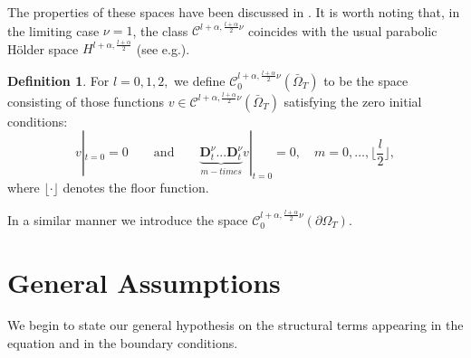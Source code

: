 \documentclass[reqno]{amsart}
\def\C {\mathcal{C}}
\theoremstyle{definition}
\newtheorem{definition}[proposition]{Definition}
\numberwithin{equation}{section}
\begin{document}
The properties of these spaces have been discussed in \cite[Section 2]{KPV3}. It is worth noting that, in the limiting case $\nu=1$, the class  $\C^{l+\alpha,\frac{l+\alpha}{2}\nu}$ coincides with the usual parabolic H\"{o}lder space $H^{l+\alpha,\frac{l+\alpha}{2}}$ (see e.g.\cite[(1.10)-(1.12)]{LSU}).
\begin{definition}\label{d2.2}
For $l=0,1,2,$ we define
$\C^{l+\alpha,\frac{l+\alpha}{2}\nu}_{0}(\bar{\Omega}_{T})$ to be
the space consisting of those functions $v\in
\C^{l+\alpha,\frac{l+\alpha}{2}\nu}(\bar{\Omega}_{T})$ satisfying
the zero initial conditions:
\begin{equation*}
 v|_{t=0}=0\qquad\text{and}\qquad
 \underbrace{\mathbf{D}_{t}^{\nu}...\mathbf{D}_{t}^{\nu}}_{m-times} v|_{t=0}=0,\quad
m=0,\ldots,\Big\lfloor\frac{l}{2}\Big\rfloor,
\end{equation*}
where $\lfloor \cdot\rfloor$ denotes the floor function.
\end{definition}
In a similar manner we introduce the space
$\C^{l+\alpha,\frac{l+\alpha}{2}\nu}_{0}(\partial\Omega_{T})$.


\section{General Assumptions}
\label{s3}

\noindent
We begin to state our general hypothesis on the structural terms
appearing in the equation and in the boundary conditions.
\end{document}

